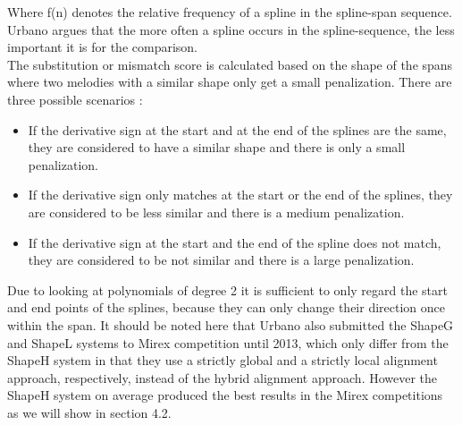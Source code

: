 \documentclass{llncs}
\begin{document}
\begin{itemize}
        Where f(n) denotes the relative frequency of a spline in the spline-span sequence. Urbano argues that the more often a spline occurs in the spline-sequence, the less important it is for the comparison. \\
        The substitution or mismatch score is calculated based on the shape of the spans where two melodies with a similar shape only get a small penalization. There are three possible scenarios : 
        \begin{itemize}
         \item If the derivative sign at the start and at the end of the splines are the same, they are considered to have a similar shape and there is only a small penalization.
         \item If the derivative sign only matches at the start or the end of the splines, they are considered to be less similar and there is a medium penalization.
         \item If the derivative sign at the start and the end of the spline does not match, they are considered to be not similar and there is a large penalization.
        \end{itemize}
        Due to looking at polynomials of degree 2 it is sufficient to only regard the start and end points of the splines, because they can only change their direction once within the span.
        It should be noted here that Urbano also submitted the ShapeG and ShapeL systems to Mirex competition until 2013, which only differ from the ShapeH system in that they use a strictly global and a strictly local alignment approach, respectively, instead of the hybrid alignment approach. However the ShapeH system on average produced the best results in the Mirex competitions as we will show in section 4.2.
  
		

\end{itemize}
\end{document}
